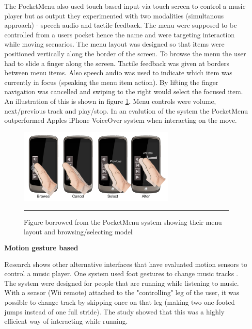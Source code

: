 The PocketMenu \cite{pielot_pocketmenu:_2012} also used touch based input via touch screen to control a music player but as output they experimented with two modalities (simultanous approach) - speech audio and tactile feedback. The menu were supposed to be controlled from a users pocket hence the name and were targeting interaction while moving scenarios. The menu layout was designed so that items were positioned vertically along the border of the screen. To browse the menu the user had to slide a finger along the screen. Tactile feedback was given at borders between menu items. Also speech audio was used to indicate which item was currently in focus (speaking the menu item action). By lifting the finger navigation was cancelled and swiping to the right would select the focused item. An illustration of this is shown in figure \ref{fig:pocketmenu}. Menu controls were volume, next/previous track and play/stop. In an evalution of the system the PocketMenu outperformed Apples iPhone VoiceOver system when interacting on the move.

\begin{figure}[t]
	\centering
		\includegraphics[width=0.7\textwidth,height=\textheight,keepaspectratio]{./Figures/pocketmenu.png}
		\rule{35em}{0.5pt}
	\caption[Pirhonen system]{Figure borrowed from the PocketMenu system \cite{pielot_pocketmenu:_2012} showing their menu layout and browsing/selecting model}
	\label{fig:pocketmenu}
\end{figure}

\textbf{Motion gesture based}

Research shows other alternative interfaces that have evaluated motion sensors to control a music player. One system used foot gestures to change music tracks \cite{smus_running_2010}. The system were designed for people that are running while listening to music. With a sensor (Wii remote) attached to the "controlling" leg of the user, it was possible to change track by skipping once on that leg (making two one-footed jumps instead of one full stride). The study showed that this was a highly efficient way of interacting while running.

